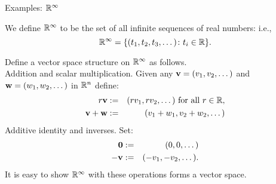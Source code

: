 \begin{frame}{Examples: \alert{${\mathbb R}^\infty$}}
\begin{definition}
We define ${\mathbb R}^\infty$ to be the set of all infinite sequences of real numbers: i.e., 
\[
{\mathbb R}^\infty=\{(t_1,t_2,t_3,\dots)\colon t_i\in{\mathbb R} \}.
\]
\end{definition}
\pause
Define a vector space structure on ${\mathbb R}^\infty$ as follows.
\\
\alert{Addition and scalar multiplication}. Given any ${\mathbf v}=(v_1,v_2,\dots)$ and ${\mathbf w}=(w_1,w_2, \dots )$ in ${\mathbb R}^n$ define:
\begin{eqnarray*}
r{\mathbf v}&:=&(rv_1,rv_2,\dots) \text{ for all $r\in{\mathbb R}$},\\
{\mathbf v}+{\mathbf w}&:=&(v_1+w_1,v_2+w_2, \dots)
\end{eqnarray*}
\pause 
\alert{Additive identity and inverses}. 
Set: 
\begin{eqnarray*}
{\mathbf 0}&:=&(0,0,\dots)\\
-{\mathbf v}&:=&(-v_1,-v_2,\dots).
\end{eqnarray*}
\pause It is easy to show ${\mathbb R}^\infty$ with these operations forms a vector space. 
\end{frame}


